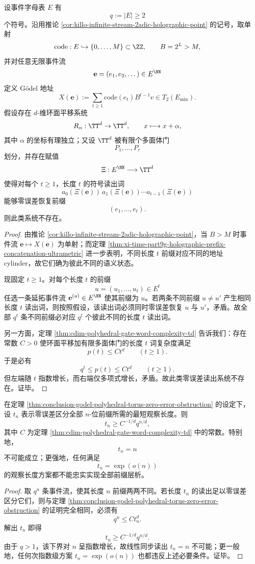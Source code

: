 \begin{theorem}\label{thm:conclusion-godel-polyhedral-torus-zero-error-obstruction}
设事件字母表 \(E\) 有
\[
q:=|E|\ge 2
\]
个符号。沿用推论 \ref{cor:killo-infinite-stream-2adic-holographic-point} 的记号，取单射
\[
\mathrm{code}:E\hookrightarrow\{0,\dots,M\}\subset\ZZ,
\qquad
B=2^L>M,
\]
并对任意无限事件流
\[
\mathbf e=(e_1,e_2,\dots)\in E^{\NN}
\]
定义 Gödel 地址
\[
X(\mathbf e):=\sum_{t\ge 1}\mathrm{code}(e_t)B^{t-1}v\in T_2(E_{\min}).
\]
假设存在 \(d\)-维环面平移系统
\[
R_\alpha:\TT^d\to\TT^d,
\qquad
x\longmapsto x+\alpha,
\]
其中 \(\alpha\) 的坐标有理独立；又设 \(\TT^d\) 被有限个多面体门
\[
P_1,\dots,P_r
\]
划分，并存在赋值
\[
\Xi:E^{\NN}\longrightarrow \TT^d
\]
使得对每个 \(t\ge 1\)，长度 \(t\) 的符号读出词
\[
a_0(\Xi(\mathbf e))\,a_1(\Xi(\mathbf e))\cdots a_{t-1}(\Xi(\mathbf e))
\]
能够零误差恢复前缀
\[
(e_1,\dots,e_t).
\]
则此类系统不存在。
\end{theorem}
\begin{proof}
由推论 \ref{cor:killo-infinite-stream-2adic-holographic-point}，当 \(B>M\) 时事件流 \(\mathbf e\mapsto X(\mathbf e)\) 为单射；而定理 \ref{thm:xi-time-part9g-holographic-prefix-concatenation-ultrametric} 进一步表明，不同长度 \(t\) 前缀对应不同的地址 cylinder，故它们确为彼此不同的语义状态。

现固定 \(t\ge 1\)。对每个长度 \(t\) 的前缀
\[
u=(u_1,\dots,u_t)\in E^t
\]
任选一条延拓事件流 \(\mathbf e^{(u)}\in E^{\NN}\) 使其前缀为 \(u\)。若两条不同前缀 \(u\neq u'\) 产生相同长度 \(t\) 读出词，则按照假设，该读出词必须同时零误差恢复 \(u\) 与 \(u'\)，矛盾。故全部 \(q^t\) 条不同前缀必对应 \(q^t\) 个彼此不同的长度 \(t\) 读出词。

另一方面，定理 \ref{thm:cdim-polyhedral-gate-word-complexity-td} 告诉我们：存在常数 \(C>0\) 使环面平移加有限多面体门的长度 \(t\) 词复杂度满足
\[
p(t)\le Ct^d
\qquad (t\ge 1).
\]
于是必有
\[
q^t\le p(t)\le Ct^d
\qquad (t\ge 1).
\]
但左端随 \(t\) 指数增长，而右端仅多项式增长，矛盾。故此类零误差读出系统不存在。证毕。
\end{proof}

\begin{corollary}[零误差前缀层析的指数观察下界]\label{cor:conclusion-godel-prefix-tomography-exponential-observation}
在定理 \ref{thm:conclusion-godel-polyhedral-torus-zero-error-obstruction} 的设定下，设 \(t_n\) 表示零误差区分全部 \(n\)-位前缀所需的最短观察长度。则
\[
t_n\ge C^{-1/d}q^{n/d},
\]
其中 \(C\) 为定理 \ref{thm:cdim-polyhedral-gate-word-complexity-td} 中的常数。特别地，
\[
t_n=n
\]
不可能成立；更强地，任何满足
\[
t_n=\exp(o(n))
\]
的观察长度方案都不能忠实实现全部前缀层析。
\end{corollary}
\begin{proof}
取 \(q^n\) 条事件流，使其长度 \(n\) 前缀两两不同。若长度 \(t_n\) 的读出足以零误差区分它们，则与定理 \ref{thm:conclusion-godel-polyhedral-torus-zero-error-obstruction} 的证明完全相同，必须有
\[
q^n\le Ct_n^d.
\]
解出 \(t_n\) 即得
\[
t_n\ge C^{-1/d}q^{n/d}.
\]
由于 \(q>1\)，该下界对 \(n\) 呈指数增长，故线性同步读出 \(t_n=n\) 不可能；更一般地，任何次指数级方案 \(t_n=\exp(o(n))\) 也都违反上述必要条件。证毕。
\end{proof}

